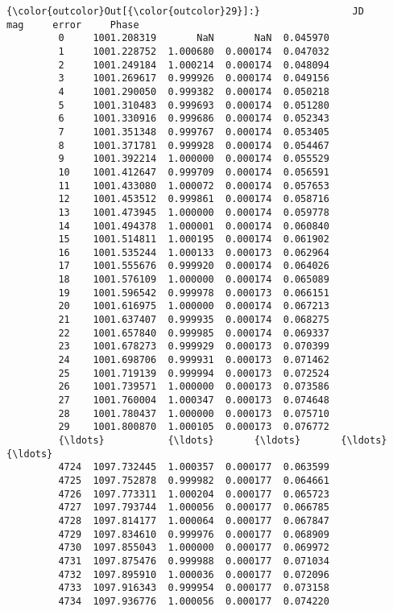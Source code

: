 \documentclass[11pt]{article}
\begin{document}
\begin{Verbatim}[commandchars=\\\{\}]
{\color{outcolor}Out[{\color{outcolor}29}]:}                JD       mag     error     Phase
         0     1001.208319       NaN       NaN  0.045970
         1     1001.228752  1.000680  0.000174  0.047032
         2     1001.249184  1.000214  0.000174  0.048094
         3     1001.269617  0.999926  0.000174  0.049156
         4     1001.290050  0.999382  0.000174  0.050218
         5     1001.310483  0.999693  0.000174  0.051280
         6     1001.330916  0.999686  0.000174  0.052343
         7     1001.351348  0.999767  0.000174  0.053405
         8     1001.371781  0.999928  0.000174  0.054467
         9     1001.392214  1.000000  0.000174  0.055529
         10    1001.412647  0.999709  0.000174  0.056591
         11    1001.433080  1.000072  0.000174  0.057653
         12    1001.453512  0.999861  0.000174  0.058716
         13    1001.473945  1.000000  0.000174  0.059778
         14    1001.494378  1.000001  0.000174  0.060840
         15    1001.514811  1.000195  0.000174  0.061902
         16    1001.535244  1.000133  0.000173  0.062964
         17    1001.555676  0.999920  0.000174  0.064026
         18    1001.576109  1.000000  0.000174  0.065089
         19    1001.596542  0.999978  0.000173  0.066151
         20    1001.616975  1.000000  0.000174  0.067213
         21    1001.637407  0.999935  0.000174  0.068275
         22    1001.657840  0.999985  0.000174  0.069337
         23    1001.678273  0.999929  0.000173  0.070399
         24    1001.698706  0.999931  0.000173  0.071462
         25    1001.719139  0.999994  0.000173  0.072524
         26    1001.739571  1.000000  0.000173  0.073586
         27    1001.760004  1.000347  0.000173  0.074648
         28    1001.780437  1.000000  0.000173  0.075710
         29    1001.800870  1.000105  0.000173  0.076772
         {\ldots}           {\ldots}       {\ldots}       {\ldots}       {\ldots}
         4724  1097.732445  1.000357  0.000177  0.063599
         4725  1097.752878  0.999982  0.000177  0.064661
         4726  1097.773311  1.000204  0.000177  0.065723
         4727  1097.793744  1.000056  0.000177  0.066785
         4728  1097.814177  1.000064  0.000177  0.067847
         4729  1097.834610  0.999976  0.000177  0.068909
         4730  1097.855043  1.000000  0.000177  0.069972
         4731  1097.875476  0.999988  0.000177  0.071034
         4732  1097.895910  1.000036  0.000177  0.072096
         4733  1097.916343  0.999954  0.000177  0.073158
         4734  1097.936776  1.000056  0.000177  0.074220

\end{Verbatim}
\end{document}
